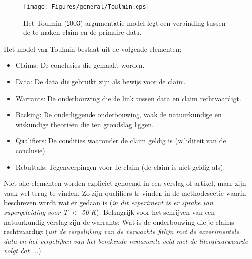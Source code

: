 \begin{figure}
    \centering
    \texttt{[image: Figures/general/Toulmin.eps]}
    \caption{Het Toulmin (2003) argumentatie model legt een verbinding tussen de te maken claim en de primaire data.}
    \label{fig:Toulmin}
\end{figure}

Het model van Toulmin bestaat uit de volgende elementen:
\begin{itemize}
    \item Claims: De conclusies die gemaakt worden.
    \item Data: De data die gebruikt zijn als bewijs voor de claim.
    \item Warrants: De onderbouwing die de link tussen data en claim rechtvaardigt.
    \item Backing: De onderliggende onderbouwing, vaak de natuurkundige en wiskundige 	theorie\"{e}n die ten grondslag liggen.
    \item Qualifiers: De condities waaronder de claim geldig is (validiteit van de conclusie).
    \item Rebuttals: Tegenwerpingen voor de claim (de claim is niet geldig als).
\end{itemize}
%
Niet alle elementen worden expliciet genoemd in een verslag of artikel, maar zijn vaak wel terug te vinden. Zo zijn qualifiers te vinden in de methodesectie waarin beschreven wordt wat er gedaan is (\textit{in dit experiment is er sprake van supergeleiding voor T $<$ 50 K}). Belangrijk voor het schrijven van een natuurkundig verslag zijn de warrants: Wat is de onderbouwing die je claims rechtvaardigt (\textit{uit de vergelijking van de verwachte fitlijn met de experimentele data en het vergelijken van het berekende remanente veld met de literatuurwaarde volgt dat ...}). 
%
